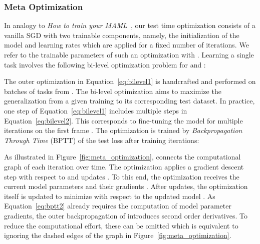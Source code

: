 \documentclass{article}
\begin{document}
    \subsubsection{Meta Optimization}
In analogy to \textit{How to train your MAML}~\cite{how_train_maml}, our test time optimization consists of a vanilla SGD with two trainable components, namely, the initialization of the model  and learning rates  which are applied for a fixed number of iterations.
We refer to the trainable parameters of such an optimization  with .
Learning a single task involves the following bi-level optimization problem for  and :

The outer optimization in Equation~\eqref{eq:bilevel1} is handcrafted and performed on batches of tasks from .
The bi-level optimization aims to maximize the generalization from a given training to its corresponding test dataset.
In practice, one step of Equation~\eqref{eq:bilevel1} includes multiple steps in Equation~\eqref{eq:bilevel2}.
This corresponds to fine-tuning the model  for multiple iterations on the first frame . The optimization  is trained by \textit{Backpropagation Through Time} (BPTT) of the test loss after  training iterations:

As illustrated in Figure~\ref{fig:meta_optimization},  connects the computational graph of each iteration over time.
The optimization applies a gradient descent step with respect to  and updates .
To this end, the optimization receives the current model parameters  and their gradients .
After  updates, the optimization itself is updated to minimize  with respect to the updated model .
As Equation~\eqref{eq:bptt2} already requires the computation of model parameter gradients, the outer backpropagation of  introduces second order derivatives. To reduce the computational effort, these can be omitted which is equivalent to ignoring the dashed edges of the graph in Figure~\ref{fig:meta_optimization}.
\end{document}
